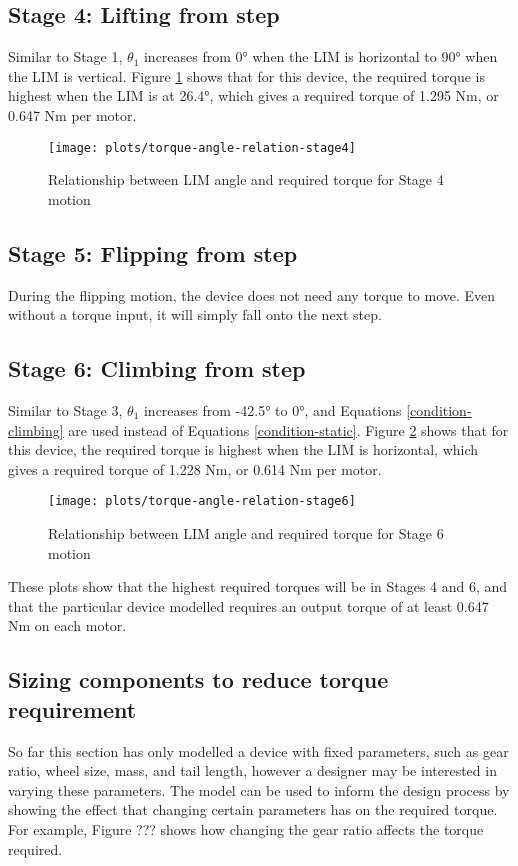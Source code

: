 \subsection*{Stage 4: Lifting from step}
Similar to Stage 1, $\theta_1$ increases from 0° when the LIM is horizontal to 90° when the LIM is vertical. Figure \ref{torque-angle-relation-stage4} shows that for this device, the required torque is highest when the LIM is at 26.4°, which gives a required torque of 1.295 Nm, or 0.647 Nm per motor.
\begin{figure}[h]
	\centering
	\texttt{[image: plots/torque-angle-relation-stage4]}
	\caption{Relationship between LIM angle and required torque for Stage 4 motion}
	\label{torque-angle-relation-stage4}
\end{figure}


\subsection*{Stage 5: Flipping from step}
During the flipping motion, the device does not need any torque to move. Even without a torque input, it will simply fall onto the next step.

\subsection*{Stage 6: Climbing from step}
Similar to Stage 3, $\theta_1$ increases from -42.5° to 0°, and Equations \ref{condition-climbing} are used instead of Equations \ref{condition-static}. Figure \ref{torque-angle-relation-stage6} shows that for this device, the required torque is highest when the LIM is horizontal, which gives a required torque of 1.228 Nm, or 0.614 Nm per motor.
\begin{figure}[h]
	\centering
	\texttt{[image: plots/torque-angle-relation-stage6]}
	\caption{Relationship between LIM angle and required torque for Stage 6 motion}
	\label{torque-angle-relation-stage6}
\end{figure}
These plots show that the highest required torques will be in Stages 4 and 6, and that the particular device modelled requires an output torque of at least 0.647 Nm on each motor.

\subsection{Sizing components to reduce torque requirement}
So far this section has only modelled a device with fixed parameters, such as gear ratio, wheel size, mass, and tail length, however a designer may be interested in varying these parameters. The model can be used to inform the design process by showing the effect that changing certain parameters has on the required torque. For example, Figure ??? shows how changing the gear ratio affects the torque required.


